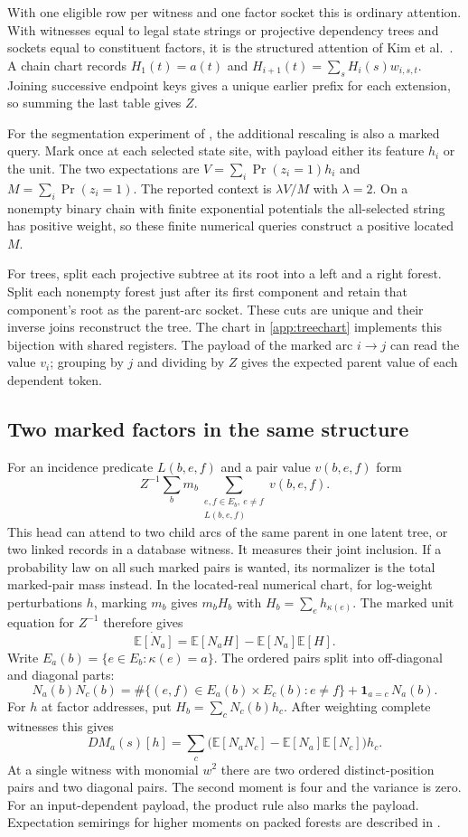\documentclass[11pt,a4paper]{article}
\theoremstyle{definition}
\theoremstyle{remark}\newaliascnt{remark}{theorem}
\numberwithin{equation}{section}
\begin{document}
With one eligible row per witness and one factor socket this is ordinary attention. With witnesses equal to legal state strings or projective dependency trees and sockets equal to constituent factors, it is the structured attention of Kim et al.~\cite{structured}. A chain chart records $H_1(t)=a(t)$ and $H_{i+1}(t)=\sum_s H_i(s)w_{i,s,t}$. Joining successive endpoint keys gives a unique earlier prefix for each extension, so summing the last table gives $Z$.

For the segmentation experiment of \cite[\S4.2 and Appendix A.3]{structured}, the additional rescaling is also a marked query. Mark once at each selected state site, with payload either its feature $h_i$ or the unit. The two expectations are $V=\sum_i\Pr(z_i=1)h_i$ and $M=\sum_i\Pr(z_i=1)$. The reported context is $\lambda V/M$ with $\lambda=2$. On a nonempty binary chain with finite exponential potentials the all-selected string has positive weight, so these finite numerical queries construct a positive located $M$.

For trees, split each projective subtree at its root into a left and a right forest. Split each nonempty forest just after its first component and retain that component's root as the parent-arc socket. These cuts are unique and their inverse joins reconstruct the tree. The chart in \cref{app:treechart} implements this bijection with shared registers. The payload of the marked arc $i\to j$ can read the value $v_i$; grouping by $j$ and dividing by $Z$ gives the expected parent value of each dependent token.

\subsection{Two marked factors in the same structure}

For an incidence predicate $L(b,e,f)$ and a pair value $v(b,e,f)$ form
\[
 Z^{-1}\sum_b m_b\!\!\sum_{\substack{e,f\in E_b,\ e\ne f\\L(b,e,f)}}v(b,e,f).
\]
This head can attend to two child arcs of the same parent in one latent tree, or two linked records in a database witness. It measures their joint inclusion. If a probability law on all such marked pairs is wanted, its normalizer is the total marked-pair mass instead. In the located-real numerical chart, for log-weight perturbations $h$, marking $m_b$ gives $m_b H_b$ with $H_b=\sum_e h_{\kappa(e)}$. The marked unit equation for $Z^{-1}$ therefore gives
\[
 \dot{\mathbb E[N_a]}=\mathbb E[N_a H]-\mathbb E[N_a]\mathbb E[H].
\]
Write \(E_a(b)=\{e\in E_b:\kappa(e)=a\}\). The ordered pairs split into off-diagonal and diagonal parts:
\[
 N_a(b)N_c(b)=
  \#\{(e,f)\in E_a(b)\times E_c(b):e\ne f\}
           +\mathbf1_{a=c}\,N_a(b).
\]
For \(h\) at factor addresses, put \(H_b=\sum_cN_c(b)h_c\). After weighting complete witnesses this gives
\[
 D M_a(s)[h]=\sum_c\bigl(\mathbb E[N_aN_c]
                         -\mathbb E[N_a]\mathbb E[N_c]\bigr)h_c.
\]
At a single witness with monomial \(w^2\) there are two ordered distinct-position pairs and two diagonal pairs. The second moment is four and the variance is zero. For an input-dependent payload, the product rule also marks the payload. Expectation semirings for higher moments on packed forests are described in \cite{moments}.
\end{document}
